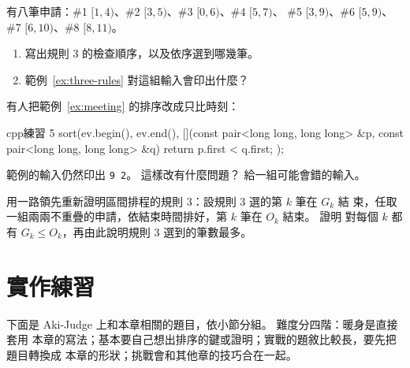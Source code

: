 \begin{drills}[label=drills:ch7]
\item 有八筆申請：\#1 $[1, 4)$、\#2 $[3, 5)$、\#3 $[0, 6)$、\#4 $[5, 7)$、
\#5 $[3, 9)$、\#6 $[5, 9)$、\#7 $[6, 10)$、\#8 $[8, 11)$。
\begin{enumerate}
\item 寫出規則 3 的檢查順序，以及依序選到哪幾筆。
\item 範例~\ref{ex:three-rules} 對這組輸入會印出什麼？
\end{enumerate}

\item 有人把範例~\ref{ex:meeting} 的排序改成只比時刻：
\begin{code}{cpp}{練習 5}
sort(ev.begin(), ev.end(),
     [](const pair<long long, long long> &p,
        const pair<long long, long long> &q) {
         return p.first < q.first;
     });
\end{code}
範例的輸入仍然印出 \texttt{9 2}。 這樣改有什麼問題？ 給一組可能會錯的輸入。

\item 用一路領先重新證明區間排程的規則 3：設規則 3 選的第 $k$ 筆在 $G_k$ 結
束，任取一組兩兩不重疊的申請，依結束時間排好，第 $k$ 筆在 $O_k$ 結束。 證明
對每個 $k$ 都有 $G_k \le O_k$，再由此說明規則 3 選到的筆數最多。
\end{drills}

\section{實作練習}
\label{sec:ch7-practice}

下面是 Aki-Judge 上和本章相關的題目，依小節分組。 難度分四階：暖身是直接套用
本章的寫法；基本要自己想出排序的鍵或證明；實戰的題敘比較長，要先把題目轉換成
本章的形狀；挑戰會和其他章的技巧合在一起。

